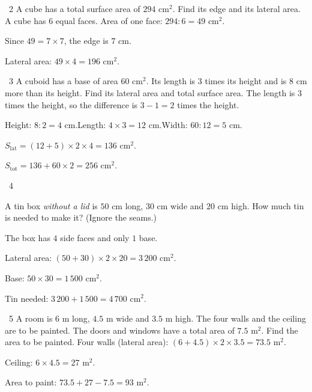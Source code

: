 \gap
\begin{exbox}{\ExWord\ 2}
A cube has a total surface area of $294$ cm$^2$. Find its edge and its lateral area.
\guide
A cube has $6$ equal faces. Area of one face: $294:6=49$ cm$^2$.\par
Since $49=7\times7$, the edge is $7$ cm.\par
Lateral area: $49\times4=196$ cm$^2$.
\end{exbox}
\gap
\begin{exbox}{\ExWord\ 3}
A cuboid has a base of area $60$ cm$^2$. Its length is $3$ times its height and is $8$ cm more than its height. Find its lateral area and total surface area.
\guide
The length is $3$ times the height, so the difference is $3-1=2$ times the height.\par
Height: $8:2=4$ cm.\quad Length: $4\times3=12$ cm.\quad Width: $60:12=5$ cm.\par
$S_{\text{lat}}=(12+5)\times2\times4=136$ cm$^2$.\par
$S_{\text{tot}}=136+60\times2=256$ cm$^2$.
\end{exbox}
\gap
\begin{exbox}{\ExWord\ 4}
\begin{minipage}[t]{0.6\linewidth}
A tin box \emph{without a lid} is $50$ cm long, $30$ cm wide and $20$ cm high. How much tin is needed to make it? (Ignore the seams.)
\end{minipage}\hfill
\begin{minipage}[t]{0.36\linewidth}\vspace{0pt}\centering
{}
\end{minipage}
\guide
The box has $4$ side faces and only $1$ base.\par
Lateral area: $(50+30)\times2\times20=3\,200$ cm$^2$.\par
Base: $50\times30=1\,500$ cm$^2$.\par
Tin needed: $3\,200+1\,500=4\,700$ cm$^2$.
\end{exbox}
\gap
\begin{exbox}{\ExWord\ 5}
A room is $6$ m long, $4.5$ m wide and $3.5$ m high. The four walls and the ceiling are to be painted. The doors and windows have a total area of $7.5$ m$^2$. Find the area to be painted.
\guide
Four walls (lateral area): $(6+4.5)\times2\times3.5=73.5$ m$^2$.\par
Ceiling: $6\times4.5=27$ m$^2$.\par
Area to paint: $73.5+27-7.5=93$ m$^2$.
\end{exbox}
